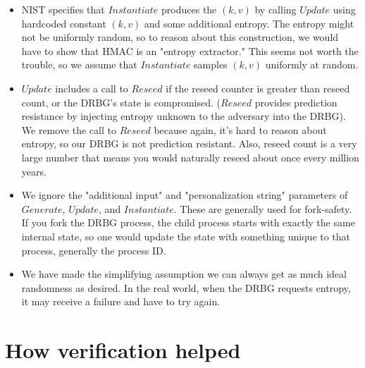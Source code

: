 \documentclass[12pt,lot, lof]{puthesis}
\newcommand{\kv} {$(k, v)$ }
\begin{document}
{\begin{itemize}
\item NIST specifies that $Instantiate$ produces the \kv  by calling $Update$ using hardcoded constant \kv and some additional entropy. The entropy might not be uniformly random, so to reason about this construction, we would have to show that HMAC is an "entropy extractor." This seems not worth the trouble, so we assume that $Instantiate$ samples \kv uniformly at random. %
\item $Update$ includes a call to $Reseed$ if the reseed counter is greater than reseed count, or the DRBG's state is compromised. ($Reseed$ provides prediction resistance by injecting entropy unknown to the adversary into the DRBG). We remove the call to $Reseed$ because again, it's hard to reason about entropy, so our DRBG is not prediction resistant. Also, reseed count is a very large number that means you would naturally reseed about once every million years.
\item We ignore the "additional input" and "personalization string" parameters of $Generate$, $Update$, and $Instantiate$. These are generally used for fork-safety. If you fork the DRBG process, the child process starts with exactly the same internal state, so one would update the state with something unique to that process, generally the process ID.
\item We have made the simplifying assumption we can always get as much ideal randomness as desired. In the real world, when the DRBG requests entropy, it may receive a failure and have to try again.
\end{itemize}




\section{How verification helped}

}
\end{document}
